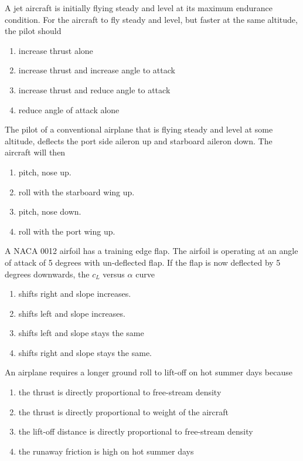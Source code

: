 \item A jet aircraft is initially flying steady and level at its maximum endurance condition. For the aircraft to fly steady and level, but faster at the same altitude, the pilot should
\begin{enumerate}
    \item increase thrust alone
    \item increase thrust and increase angle to attack
    \item increase thrust and reduce angle to attack
    \item reduce angle of attack alone
\end{enumerate}
\item The pilot of a conventional airplane that is flying steady and level at some altitude, deflects the port side aileron up and starboard aileron down. The aircraft will then
\begin{enumerate}
    \item pitch, nose up.
    \item roll with the starboard wing up.
    \item pitch, nose down.
    \item roll with the port wing up.
\end{enumerate}
\item A NACA 0012 airfoil has a training edge flap. The airfoil is operating at an angle of attack of 5 degrees with un-deflected flap. If the flap is now deflected by 5 degrees downwards, the $c_L$ versus $\alpha$ curve
\begin{enumerate}
    \item shifts right and slope increases.
    \item shifts left and slope increases.
    \item shifts left and slope stays the same
    \item shifts right and slope stays the same.
\end{enumerate}
\item An airplane requires a longer ground roll to lift-off on hot summer days because
\begin{enumerate}
    \item the thrust is directly proportional to free-stream density
    \item the thrust is directly proportional to weight of the aircraft
    \item the lift-off distance is directly proportional to free-stream density
    \item the runaway friction is high on hot summer days
\end{enumerate}
